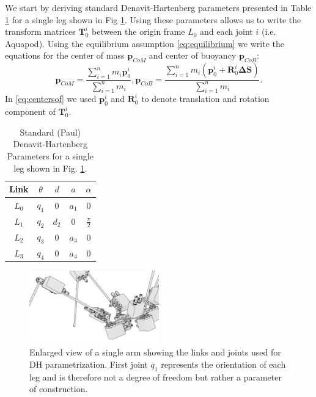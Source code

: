 We start by deriving standard Denavit-Hartenberg parameters presented in Table \ref{tab:DHParameters} for a single leg shown in Fig \ref{fig:DHParameters}. Using these parameters allows us to write the transform matrices $\textbf{T}_0^i$ between the origin frame $L_0$ and each joint $i$ (i.e. Aquapod). Using the equilibrium assumption \eqref{eq:equilibrium} we write the equations for the center of mass $\textbf{p}_{CoM}$ and center of buoyancy $\textbf{p}_{CoB}$:
\begin{equation}\label{eq:centersof}
\textbf{p}_{CoM} = \frac{\sum_{i=1}^n m_i \textbf{p}_0^i}{\sum_{i=1}^n m_i},\textbf{p}_{CoB} = \frac{\sum_{i=1}^n m_i( \textbf{p}_0^i+\textbf{R}_0^i \boldsymbol{\Delta}\textbf{S})}{\sum_{i=1}^n m_i}.
\end{equation} 
In \eqref{eq:centersof} we used $\textbf{p}_0^i$ and $\textbf{R}_0^i$ to denote translation and rotation component of $\textbf{T}_0^i$.

\begin{table}[!t]
	\centering
	\caption{{Standard (Paul)} Denavit-Hartenberg Parameters for a single leg shown in Fig. \ref{fig:DHParameters}.}\label{tab:DHParameters}
	\begin{tabular}{ccccc}
		Link & $\theta$ & $d$ & $a$ & $\alpha$ \\\hline
		$L_0$ & $q_1$ & $0$ & $a_1$ & $0$\\
		$L_1$ & $q_2$ & $d_2$ & $0$ & $\frac{\pi}{2}$\\
		$L_2$ & $q_3$ & $0$ & $a_3$ & $0$\\
		$L_3$ & $q_4$ & $0$ & $a_4$ & $0$
	\end{tabular}
\end{table}

\begin{figure}
	\centering
	\includegraphics[width=0.5\textwidth]{./img/DHParameters.png}
	\caption{Enlarged view of a single arm showing the links and joints used for DH parametrization. First joint $q_1$ represents the orientation of each leg and is therefore not a degree of freedom but rather a parameter of construction.}
	\label{fig:DHParameters}
\end{figure}

